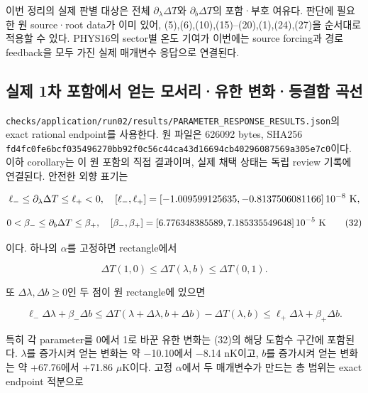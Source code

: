 이번 정리의 실제 판별 대상은 전체 \(\partial_\lambda\Delta T\)와 \(\partial_b\Delta T\)의 포함·부호 여유다. 판단에 필요한 원 source·root data가 이미 있어, (5),(6),(10),(15)--(20),(1),(24),(27)을 순서대로 적용할 수 있다. PHYS16의 sector별 온도 기여가 이번에는 source forcing과 경로 feedback을 모두 가진 실제 매개변수 응답으로 연결된다.

\hypertarget{uxc2e4uxc81c-1uxcc28-uxd3ecuxd568uxc5d0uxc11c-uxc5bbuxb294-uxbaa8uxc11cuxb9acuxc720uxd55c-uxbcc0uxd654uxb4f1uxacb0uxd568-uxace1uxc120}{%
\subsection{실제 1차 포함에서 얻는 모서리·유한 변화·등결함 곡선}\label{uxc2e4uxc81c-1uxcc28-uxd3ecuxd568uxc5d0uxc11c-uxc5bbuxb294-uxbaa8uxc11cuxb9acuxc720uxd55c-uxbcc0uxd654uxb4f1uxacb0uxd568-uxace1uxc120}}

\begin{flushleft}
\nolinkurl{checks/application/run02/results/PARAMETER_RESPONSE_RESULTS.json}의 exact rational endpoint를 사용한다. 원 파일은 626092 bytes, SHA256 \texttt{fd4fc0fe6bcf0354\allowbreak{}96270bb92f0c56c4\allowbreak{}4ca43d16694cb402\allowbreak{}96087569a305e7c0}이다. 이하 corollary는 이 원 포함의 직접 결과이며, 실제 채택 상태는 독립 review 기록에 연결된다. 안전한 외향 표기는
\end{flushleft}

\[
\ell_-\le\partial_\lambda\Delta T\le\ell_+<0,
\quad [\ell_-,\ell_+]=[-1.009599125635,-0.8137506081166]\,10^{-8}\ {\rm K},
\]

\[
0<\beta_-\le\partial_b\Delta T\le\beta_+,
\quad[\beta_-,\beta_+]=[6.776348385589,7.185335549648]\,10^{-5}\ {\rm K}
\tag{32}
\]

이다. 하나의 \(\alpha\)를 고정하면 rectangle에서

\[
\boxed{\Delta T(1,0)\le\Delta T(\lambda,b)\le\Delta T(0,1).}
\tag{33}
\]

또 \(\Delta\lambda,\Delta b\ge0\)인 두 점이 원 rectangle에 있으면

\[
\boxed{\ell_-\Delta\lambda+\beta_-\Delta b
\le\Delta T(\lambda+\Delta\lambda,b+\Delta b)-\Delta T(\lambda,b)
\le\ell_+\Delta\lambda+\beta_+\Delta b.}
\tag{34}
\]

특히 각 parameter를 0에서 1로 바꾼 유한 변화는 (32)의 해당 도함수 구간에 포함된다. \(\lambda\)를 증가시켜 얻는 변화는 약 −10.10에서 −8.14 nK이고, \(b\)를 증가시켜 얻는 변화는 약 +67.76에서 +71.86 \(\mu\mathrm K\)이다. 고정 \(\alpha\)에서 두 매개변수가 만드는 총 범위는 exact endpoint 적분으로

